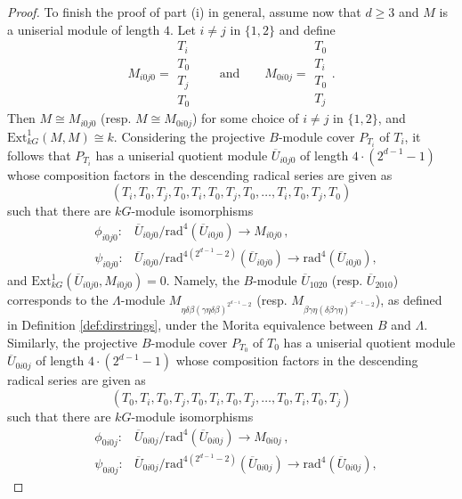 \documentclass{amsart}
\theoremstyle{plain}
\theoremstyle{definition}
\theoremstyle{remark}
\begin{document}
\begin{proof}
To finish the proof of part (i) in general,
assume now
that $d\ge 3$ and $M$ is a uniserial module of length $4$. 
Let $i\neq j$ in $\{1,2\}$ and define
$$M_{i0j0}=\begin{array}{c}T_i\\T_0\\T_j\\T_0\end{array}\qquad\mbox{and}\qquad 
M_{0i0j}=\begin{array}{c}T_0\\T_i\\T_0\\T_j\end{array}.$$
Then $M\cong M_{i0j0}$ (resp.  $M\cong M_{0i0j}$) for some choice of
$i\neq j$ in $\{1,2\}$, and $\mathrm{Ext}^1_{kG}(M,M)\cong k$. 
Considering the projective $B$-module cover $P_{T_i}$ of $T_i$, 
it follows that $P_{T_i}$ has a uniserial quotient module 
$\overline{U}_{i0j0}$ of length $4\cdot (2^{d-1}-1)$ whose
composition factors in the descending radical series are given as
$$(T_i,T_0,T_j,T_0,T_i,T_0,T_j,T_0,\ldots,T_i,T_0,T_j,T_0)$$
such that there are $kG$-module isomorphisms
\begin{eqnarray*}
&\phi_{i0j0}: & \overline{U}_{i0j0} /\mathrm{rad}^{4} (\overline{U}_{i0j0})
\to M_{i0j0}\,,\\
&\psi_{i0j0}: & \overline{U}_{i0j0}/\mathrm{rad}^{4(2^{d-1}-2)} 
(\overline{U}_{i0j0})\to \mathrm{rad}^{4} (\overline{U}_{i0j0}), 
\end{eqnarray*}
and $\mathrm{Ext}^1_{kG}(\overline{U}_{i0j0},M_{i0j0})=0$.
Namely, the $B$-module $\overline{U}_{1020}$ (resp. $\overline{U}_{2010}$)
corresponds to the $\Lambda$-module $M_{\eta\delta\beta(\gamma\eta\delta\beta)^{2^{d-1}-2}}$ 
(resp. $M_{\beta\gamma\eta(\delta\beta\gamma\eta)^{2^{d-1}-2}}$), as defined in Definition 
\ref{def:dirstrings}, under the Morita equivalence between $B$ and $\Lambda$.
Similarly, the projective $B$-module cover $P_{T_0}$ of $T_0$
has a uniserial quotient module $\overline{U}_{0i0j}$ of length $4\cdot (2^{d-1}-1)$ whose 
composition factors in the descending radical series are given as
$$(T_0,T_i,T_0,T_j,T_0,T_i,T_0,T_j,\ldots,T_0,T_i,T_0,T_j)$$
such that there are $kG$-module isomorphisms
\begin{eqnarray*}
&\phi_{0i0j}: &\overline{U}_{0i0j} /\mathrm{rad}^{4} (\overline{U}_{0i0j})
\to M_{0i0j}\,,\\
&\psi_{0i0j}: &\overline{U}_{0i0j}/\mathrm{rad}^{4(2^{d-1}-2)} 
(\overline{U}_{0i0j}) \to \mathrm{rad}^{4} (\overline{U}_{0i0j}),

\end{eqnarray*}
\end{proof}
\end{document}
